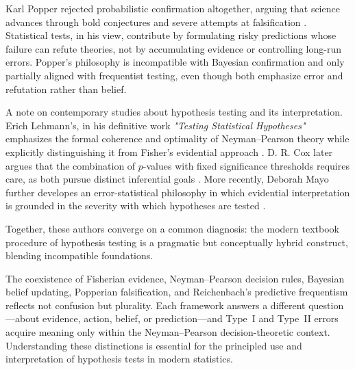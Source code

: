 \medskip

Karl Popper rejected probabilistic confirmation altogether, arguing that science advances through bold conjectures and severe attempts at falsification \cite{popper_1934_logic}.  Statistical tests, in his view, contribute by formulating risky predictions whose failure can refute theories, not by accumulating evidence or controlling long-run errors.  Popper’s philosophy is incompatible with Bayesian confirmation and only partially aligned with frequentist testing, even though both emphasize error and refutation rather than belief.

\medskip

A note on contemporary studies about hypothesis testing and its interpretation. Erich Lehmann's, in his definitive work \textit{"Testing Statistical Hypotheses"} emphasizes the formal coherence and optimality of Neyman–Pearson theory while explicitly distinguishing it from Fisher’s evidential approach \cite{lehmann_1959_testing}.  D. R. Cox later argues that the combination of \(p\)-values with fixed significance thresholds requires care, as both pursue distinct inferential goals \cite{cox_2006_principles}. More recently, Deborah Mayo further developes an error-statistical philosophy in which evidential interpretation is grounded in the severity with which hypotheses are tested \cite{mayo_1996_error,mayo_2018_severe}.

Together, these authors converge on a common diagnosis: the modern textbook procedure of hypothesis testing is a pragmatic but conceptually hybrid construct, blending incompatible foundations.

\medskip

The coexistence of Fisherian evidence, Neyman–Pearson decision rules, Bayesian belief updating, Popperian falsification, and Reichenbach’s predictive frequentism reflects not confusion but plurality.  Each framework answers a different question—about evidence, action, belief, or prediction—and Type~I and Type~II errors acquire meaning only within the Neyman–Pearson decision-theoretic context.  Understanding these distinctions is essential for the principled use and interpretation of hypothesis tests in modern statistics.


